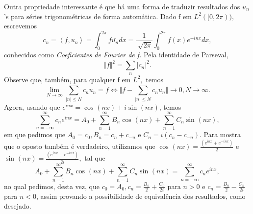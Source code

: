 \documentclass[measure_theory.tex]{subfiles}
\begin{document}
Outra propriedade interessante é que há uma forma de traduzir resultados dos \(u_{n}\)'s para séries trigonométricas de forma automática. Dado f em \(L^{2}([0, 2\pi )),\) escrevemos
\[
	c_{n} = \left< f, u_{n} \right> = \int_{0}^{2\pi }f\overline{u_{n}}dx = \frac{1}{\sqrt[]{2\pi }}\int_{0}^{2\pi }f(x)e^{-inx}dx,
\]
conhecidos como \textit{Coeficientes de Fourier de f.} Pela identidade de Parseval,
\[
	\Vert f \Vert^{2} = \sum\limits_{n}^{}|c_{n}|^{2}.
\]
Observe que, também, para qualquer f em \(L^{2},\) temos
\[
	\lim_{N\to \infty}\sum\limits_{|n|\leq N}^{}c_{n}u_{n} = f \Longleftrightarrow \biggl\Vert f - \sum\limits_{|n| \leq N}^{}c_{n}u_{n}\biggr\Vert\to 0, N\to \infty.
\]
Agora, usando que \(e^{inx} = \cos^{}{(nx)} + i \sin^{}{(nx)}\), temos
\[
	\sum\limits_{n=-\infty}^{\infty}c_{n}e^{inx} = A_{0} + \sum\limits_{n=1}^{\infty}B_{n}\cos^{}{(nx)} + \sum\limits_{n=1}^{\infty}C_{n}\sin^{}{(nx)},
\]
em que pedimos que \(A_{0} = c_{0}, B_{n} = c_{n} + c_{-n}\) e \(C_{n} = i(c_{n} - c_{-n}).\) Para mostra que o oposto também é verdadeiro, utilizamos que
\(\cos^{}{(nx)} = \frac{(e^{inx} + e^{-inx})}{2}\) e \(\sin^{}{(nx)} = \frac{(e^{inx} - e^{-inx})}{2i},\) tal que
\[
	A_{0} + \sum\limits_{n=1}^{\infty}B_{n}\cos^{}{(nx)} + \sum\limits_{n=1}^{\infty}C_{n}\sin^{}{(nx)} = \sum\limits_{n=-\infty}^{\infty}c_{n}e^{inx},
\]
no qual pedimos, desta vez, que \(c_{0} = A_{0}, c_{n} = \frac{B_{n}}{2} + \frac{C_{n}}{2i}\) para \(n > 0\) e \(c_{n} = \frac{B_{n}}{2} - \frac{C_{n}}{2i}\) para \(n < 0\), assim provando a possibilidade de equivalência dos resultados, como desejado.
\end{document}

